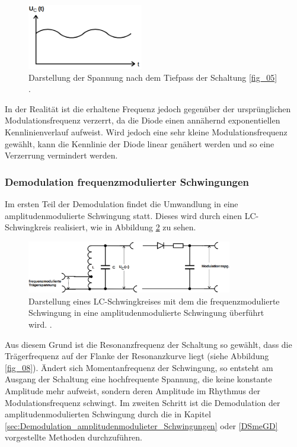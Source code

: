 \begin{figure}
    \centering
    \includegraphics[width=0.45\textwidth]{ressources/A7.png}
    \caption{Darstellung der Spannung nach dem Tiefpass der Schaltung \ref{fig_05} \cite{skript}.}
    \label{fig_07}
\end{figure}

In der Realität ist die erhaltene Frequenz jedoch gegenüber der ursprünglichen Modulationsfrequenz verzerrt, da die Diode einen annähernd exponentiellen Kennlinienverlauf aufweist. Wird jedoch eine sehr kleine Modulationsfrequenz gewählt, kann die Kennlinie der Diode linear genähert werden und so eine Verzerrung vermindert werden.

\subsubsection{Demodulation frequenzmodulierter Schwingungen}
\label{sec:Demodulation_frequenzmodulieter_Schwingungen}
Im ersten Teil der Demodulation findet die Umwandlung in eine amplitudenmodulierte Schwingung statt. Dieses wird durch einen LC-Schwingkreis realisiert, wie in Abbildung \ref{fig_12} zu sehen. 

\begin{figure}
    \centering
    \includegraphics[width=0.80\textwidth]{ressources/A12.png}
    \caption{Darstellung eines LC-Schwingkreises mit dem die frequenzmodulierte Schwingung in eine amplitudenmodulierte Schwingung überführt wird. \cite{skript}.}
    \label{fig_12}
\end{figure}


Aus diesem Grund ist die Resonanzfrequenz der Schaltung so gewählt, dass die Trägerfrequenz auf der Flanke der Resonanzkurve liegt (siehe Abbildung \ref{fig_08}). Ändert sich Momentanfrequenz der Schwingung, so entsteht am Ausgang der Schaltung eine hochfrequente Spannung, die keine konstante Amplitude mehr aufweist, sondern deren Amplitude im Rhythmus der Modulationsfrequenz schwingt. Im zweiten Schritt ist die Demodulation der amplitudenmodulierten Schwingung durch die in Kapitel \ref{sec:Demodulation_amplitudenmodulieter_Schwingungen} oder \ref{DSmeGD} vorgestellte Methoden durchzuführen. 

